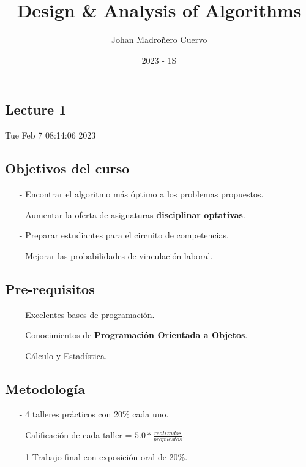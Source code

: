 \documentclass{article}
\author{Johan Madroñero Cuervo}
\title{Design \& Analysis of Algorithms}
\date{2023 - 1S}
\theoremstyle{definition}
\begin{document}
\maketitle
\thispagestyle{empty}
\newpage
\tableofcontents
\thispagestyle{empty}
\newpage

\begin{flushleft}

\section{Lecture 1}
Tue Feb  7 08:14:06 2023

\subsection{Objetivos del curso}
\begin{itemize}

  \item[-] Encontrar el algoritmo más óptimo a los problemas propuestos.
  \item[-] Aumentar la oferta de asignaturas \textbf{disciplinar optativas}.
  \item[-] Preparar estudiantes para el circuito de competencias.
  \item[-] Mejorar las probabilidades de vinculación laboral.

\end{itemize}

\subsection{Pre-requisitos}

\begin{itemize}
  \item[-] Excelentes bases de programación.
  \item[-] Conocimientos de \textbf{Programación Orientada a Objetos}.
  \item[-] Cálculo y Estadística.
\end{itemize}

\subsection{Metodología}

\begin{itemize}

  \item[-] 4 talleres prácticos con 20\% cada uno.
  \item[-] Calificación de cada taller = $5.0 * \frac{realizados}{propuestos}$.
  \item[-] 1 Trabajo final con exposición oral de 20\%.


\end{itemize}
\end{flushleft}
\end{document}
